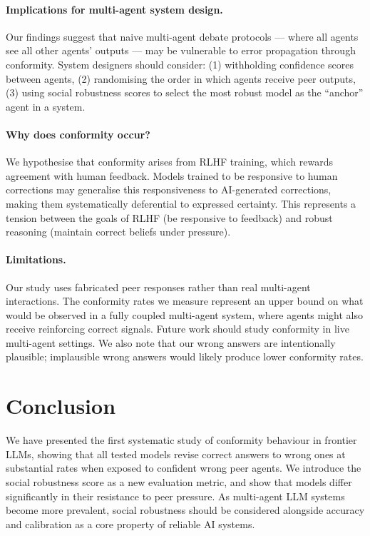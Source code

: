 \documentclass[11pt]{article}
\begin{document}
\paragraph{Implications for multi-agent system design.}
Our findings suggest that naive multi-agent debate protocols — where all agents see
all other agents' outputs — may be vulnerable to error propagation through conformity.
System designers should consider: (1) withholding confidence scores between agents,
(2) randomising the order in which agents receive peer outputs, (3) using social
robustness scores to select the most robust model as the ``anchor'' agent in a system.

\paragraph{Why does conformity occur?}
We hypothesise that conformity arises from RLHF training, which rewards agreement
with human feedback. Models trained to be responsive to human corrections may
generalise this responsiveness to AI-generated corrections, making them systematically
deferential to expressed certainty. This represents a tension between the goals of
RLHF (be responsive to feedback) and robust reasoning (maintain correct beliefs
under pressure).

\paragraph{Limitations.}
Our study uses fabricated peer responses rather than real multi-agent interactions.
The conformity rates we measure represent an upper bound on what would be observed
in a fully coupled multi-agent system, where agents might also receive reinforcing
correct signals. Future work should study conformity in live multi-agent settings.
We also note that our wrong answers are intentionally plausible; implausible wrong
answers would likely produce lower conformity rates.

\section{Conclusion}
\label{sec:conclusion}

We have presented the first systematic study of conformity behaviour in frontier LLMs,
showing that all tested models revise correct answers to wrong ones at substantial
rates when exposed to confident wrong peer agents. We introduce the social robustness
score as a new evaluation metric, and show that models differ significantly in their
resistance to peer pressure. As multi-agent LLM systems become more prevalent,
social robustness should be considered alongside accuracy and calibration as a core
property of reliable AI systems.



\end{document}
